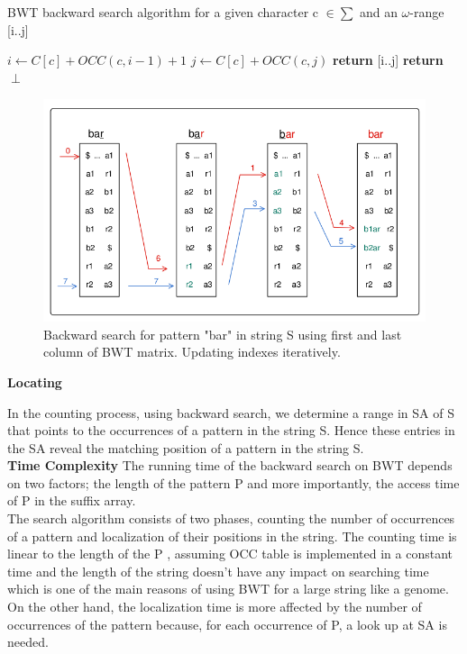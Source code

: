 \documentclass[11pt,a4paper]{report}
\begin{document}
\begin{algorithm}[H]
   \caption{BWT backward search algorithm for a 
   given character c $\in \sum $ and an 
   $\omega$-range [i..j]}
   
    \begin{algorithmic}[1]
       	\State ${i \leftarrow C[c] + OCC(c, i-1)+1}$
        \State ${j \leftarrow C[c] + OCC(c,j)}$
        		\State \textbf{return} [i..j]
        	\Else
        		\State \textbf{return} $\perp$
        	\EndIf 
    \EndFunction

	\end{algorithmic}
  \label{backward search alg}	
\end{algorithm}




\begin{figure}[H]
\centering
\includegraphics[width=12cm]{pictures/bar_1.png}
\caption{Backward search for pattern "bar" in 
string S using first and 
last column of BWT matrix. Updating indexes 
iteratively.}
\label{backwardSearch}
\end{figure}


\textbf{Locating} \label{Locating}

In the counting process, using backward search, we determine a range in SA of S
that points to the occurrences of a pattern in the string S. Hence these entries
in the SA reveal the matching position of a pattern in the string S.\\

\textbf{Time Complexity} 
The running time of the backward search on BWT depends on two factors; the length 
of the pattern P and more importantly, the access time of P in the suffix array.\\
The search algorithm consists of two phases, counting the number of occurrences 
of a pattern and localization of their positions in the string. The counting time 
is linear to the length of the P , assuming OCC table is implemented in a constant
time and the length of the string doesn't have any impact on searching time which 
is one of the main reasons of using BWT for a large string like a genome. On the 
other hand, the localization time is more affected by the number of occurrences of 
the pattern  because, for each occurrence of P, a look up at SA is needed.
\end{document}
